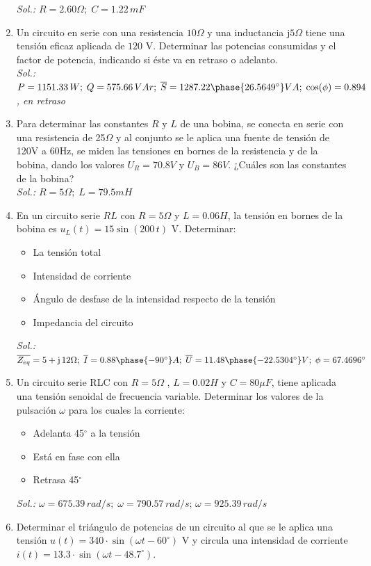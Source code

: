 \documentclass[11pt]{book} %
\begin{document}
\begin{enumerate}
    \emph{Sol.: $R=2.60\Omega;\;C=1.22\,mF$}
    \item Un circuito en serie con una resistencia $10\Omega$ y una inductancia $\mathrm{j}5\Omega$ tiene una tensión eficaz aplicada de $120$ V. Determinar las potencias consumidas y el factor de potencia, indicando si éste va en retraso o adelanto. \\
    \emph{Sol.: $P=1151.33 \,W;\; Q=575.66 \,VAr;\; \overline{S}=1287.22\phase{26.5649^\circ} VA;\; \cos(\phi)=0.894$, en retraso}
    \item Para determinar las constantes $R$ y $L$ de una bobina, se conecta en serie con una resistencia de {25}{$\Omega$} y al conjunto se le aplica una fuente de tensión de {120}{V} a {60}{Hz}, se miden las tensiones en bornes de la resistencia y de la bobina, dando los valores $U_R = {70.8}{V}$ y $U_B = {86}{V}$. ¿Cuáles son las constantes de la bobina?\\
    \emph{Sol.: $R= 5{\Omega};\; L = {79.5}mH$}
    \item En un circuito serie $RL$ con $R=5\Omega$ y $L=0.06H$, la tensión en bornes de la bobina es $u_L(t)=15\sin(200\,t)$ V. Determinar:
    \begin{itemize}
        \item La tensión total
        \item Intensidad de corriente
        \item Ángulo de desfase de la intensidad respecto de la tensión
        \item Impedancia del circuito
    \end{itemize}
    \emph{Sol.: $\overline{Z_{eq}}=5+\mathrm{j}\,12\Omega;\;\overline{I}=0.88\phase{-90^\circ}A;\;\overline{U}=11.48\phase{-22.5304^\circ} V;\; \phi=67.4696^\circ$}
    \item Un circuito serie RLC con $R = {5}{\Omega}$ , $L = {0.02}{H}$ y $C={80}{\mu F}$, tiene aplicada una tensión senoidal de frecuencia variable. Determinar los valores de la pulsación $\omega$ para los cuales la corriente:
\begin{itemize}
\item Adelanta {45}{$^\circ$} a la tensión
\item Está en fase con ella
\item Retrasa {45}{$^\circ$}
\end{itemize}
\emph{Sol.: $\omega=675.39\,rad/s;\; \omega=790.57\,rad/s;\, \omega=925.39\,rad/s$}
\item Determinar el triángulo de potencias de un circuito al que se le aplica una tensión $u(t)=340 \cdot \sin(\omega t - 60^\circ)$ V y circula una intensidad de corriente $i(t)= 13.3 \cdot \sin(\omega t-48.7^\circ)$.\\

\end{enumerate}
\end{document}
